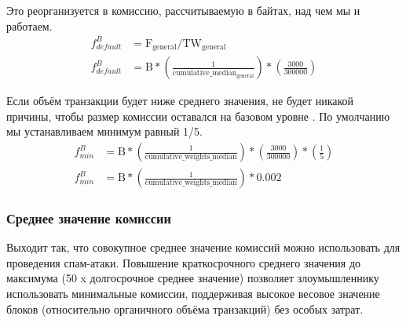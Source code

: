 Это реорганизуется в комиссию, рассчитываемую в байтах, над чем мы и работаем.\vspace{.175cm}
\begin{align*}
    f^{B}_{default} &= \textrm{F}_{\textrm{general}}/\textrm{TW}_{\textrm{general}}\\
    f^{B}_{default} &= \textrm{B}*(\frac{1}{\textrm{cumulative\_median}_{\textrm{general}}}) * (\frac{3000}{300000})
\end{align*}{}

Если объём транзакции будет ниже среднего значения, не будет никакой причины, чтобы размер комиссии оставался на базовом уровне \cite{jollymore-old-analysis}. По умолчанию мы устанавливаем минимум равный 1/5.\vspace{.175cm}
\begin{align*}
    f^{B}_{min} &= \textrm{B}*(\frac{1}{\textrm{cumulative\_weights\_median}}) * (\frac{3000}{300000}) * (\frac{1}{5})\\
    f^{B}_{min} &= \textrm{B}*(\frac{1}{\textrm{cumulative\_weights\_median}}) * 0.002
\end{align*}{}

\subsubsection*{Среднее значение комиссии}

Выходит так, что совокупное среднее значение комиссий можно использовать для проведения спам-атаки. Повышение краткосрочного среднего значения до максимума (50 x долгосрочное среднее значение) позволяет злоумышленнику использовать минимальные комиссии, поддер\-живая высокое весовое значение блоков (относительно органичного объёма транзакций) без особых затрат.

